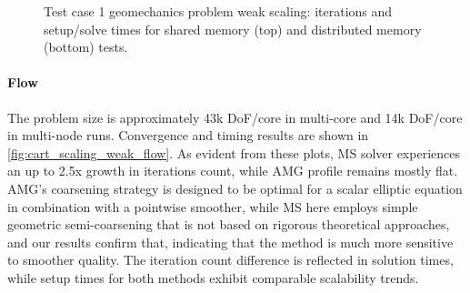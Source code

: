 \begin{figure} [htbp]
  \begin{subfigure}[t]{0.48\textwidth}
    \centering
    
  \end{subfigure}
  \hfill
  \begin{subfigure}[t]{0.48\textwidth}
    \centering
    
  \end{subfigure}
  \begin{subfigure}[t]{0.48\textwidth}
    \centering
    
  \end{subfigure}
  \hfill
  \begin{subfigure}[t]{0.48\textwidth}
    \centering
    
  \end{subfigure}
  \caption[Test case 1 geomechanics problem weak scaling]{Test case 1 geomechanics problem weak scaling: iterations and setup/solve times for shared memory (top) and distributed memory (bottom) tests.}
  \label{fig:cart_scaling_weak_mech}
\end{figure}

\paragraph{Flow}
The problem size is approximately 43k DoF/core in multi-core and 14k DoF/core in multi-node runs.   Convergence and timing results are shown in \cref{fig:cart_scaling_weak_flow}.   As evident from these plots, MS solver experiences an up to 2.5x growth in iterations count, while AMG profile remains mostly flat.   AMG's coarsening strategy is designed to be optimal for a scalar elliptic equation in combination with a pointwise smoother, while MS here employs simple geometric semi-coarsening that is not based on rigorous theoretical approaches, and our results confirm that, indicating that the method is much more sensitive to smoother quality.   The iteration count difference is reflected in solution times, while setup times for both methods exhibit comparable scalability trends.

